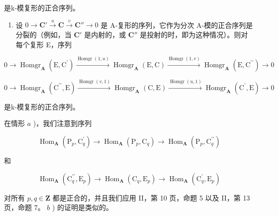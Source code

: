 是k-模复形的正合序列。

\begin{enumerate}
\def\labelenumi{\alph{enumi})}
\setcounter{enumi}{1}
\tightlist
\item
  设 \(0 \to \mathbf{C}' \xrightarrow{u} \mathbf{C} \xrightarrow{v} \mathbf{C}'' \to 0\) 是 A-复形的序列，它作为分次 A-模的正合序列是分裂的（例如，当 \(\mathbf{C}'\) 是内射的，或 \(\mathbf{C}''\) 是投射的时，即为这种情况）。则对每个复形 E，序列
\end{enumerate}

\[
0 \rightarrow \operatorname{Homgr} _ {\mathbf {A}} (\mathrm{E}, \mathrm{C} ^ {\prime}) \xrightarrow {\operatorname{Homgr} (1 , u)} \operatorname{Homgr} _ {\mathbf {A}} (\mathrm{E}, \mathrm{C}) \xrightarrow {\operatorname{Homgr} (1 , v)} \operatorname{Homgr} _ {\mathbf {A}} (\mathrm{E}, \mathrm{C} ^ {\prime \prime}) \rightarrow 0
\]

\[
0 \rightarrow \operatorname{Homgr} _ {\mathbf {A}} \left(\mathrm{C} ^ {\prime \prime}, \mathrm{E}\right) \xrightarrow {\operatorname{Homgr} (v , 1)} \operatorname{Homgr} _ {\mathbf {A}} (\mathrm{C}, \mathrm{E}) \xrightarrow {\operatorname{Homgr} (u , 1)} \operatorname{Homgr} _ {\mathbf {A}} \left(\mathrm{C} ^ {\prime}, \mathrm{E}\right)\rightarrow 0
\]

是k-模复形的正合序列。

在情形 \(a\) )，我们注意到序列

\[
\operatorname{Hom} _ {\mathbf {A}} \left(\mathrm{P} _ {p}, \mathrm{C} _ {q} ^ {\prime}\right)\rightarrow \operatorname{Hom} _ {\mathbf {A}} \left(\mathrm{P} _ {p}, \mathrm{C} _ {q}\right)\rightarrow \operatorname{Hom} _ {\mathbf {A}} \left(\mathrm{P} _ {p}, \mathrm{C} _ {q} ^ {\prime \prime}\right)
\]

和

\[
\operatorname{Hom} _ {\mathbf {A}} \left(\mathrm{C} _ {q} ^ {\prime \prime}, \mathrm{E} _ {p}\right)\rightarrow \operatorname{Hom} _ {\mathbf {A}} \left(\mathrm{C} _ {q}, \mathrm{E} _ {p}\right)\rightarrow \operatorname{Hom} _ {\mathbf {A}} \left(\mathrm{C} _ {q} ^ {\prime}, \mathrm{E} _ {p}\right)
\]

对所有 \(p, q \in \mathbf{Z}\) 都是正合的，并且我们应用 II，第 10 页，命题 5 以及 II，第 13 页，命题 7。 \(b\) ) 的证明是类似的。

